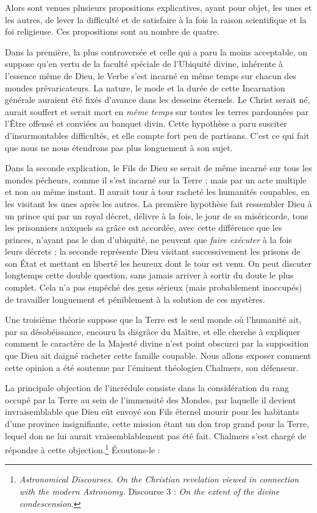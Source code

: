 \documentclass[a4paper, 11pt, oneside, landscape]{article}
\begin{document}
Alors sont venues plusieurs propositions explicatives, ayant pour objet, les unes et les autres, de lever la difficulté et de satisfaire à la fois la raison scientifique et la foi religieuse. Ces propositions sont au nombre de quatre.

Dans la première, la plus controversée et celle qui a paru la moins acceptable, on suppose qu'en vertu de la faculté spéciale de l'Ubiquité divine, inhérente à l'essence même de Dieu, le Verbe s'est incarné en même temps sur chacun des mondes prévaricateurs. La nature, le mode et la durée de cette Incarnation générale auraient été fixés d'avance dans les desseins éternels. Le Christ serait né, aurait souffert et serait mort en \emph{même temps} sur toutes les terres pardonnées par l'Être offensé et conviées au banquet divin. Cette hypothèse a paru susciter d'insurmontables difficultés, et elle compte fort peu de partisans. C'est ce qui fait que nous ne nous étendrons pas plus longuement à son sujet.

Dans la seconde explication, le Fils de Dieu se serait de même incarné sur tous les mondes pécheurs, comme il s'est incarné sur la Terre ; mais par un acte multiple et non au même instant. Il aurait tour à tour racheté les humanités coupables, en les visitant les unes après les autres. La première hypothèse fait ressembler Dieu à un prince qui par un royal décret, délivre à la fois, le jour de sa miséricorde, tous les prisonniers auxquels sa grâce est accordée, avec cette différence que les princes, n'ayant pas le don d'ubiquité, ne peuvent que \emph{faire exécuter} à la fois leurs décrets ; la seconde représente Dieu visitant successivement les prisons de son État et mettant en liberté les heureux dont le tour est venu. On peut discuter longtemps cette double question, sans jamais arriver à sortir du doute le plus complet. Cela n'a pas empêché des gens sérieux (mais probablement inoccupés) de travailler longuement et péniblement à la solution de ces mystères.

Une troisième théorie suppose que la Terre est le seul monde où l'humanité ait, par sa désobéissance, encouru la disgrâce du Maître, et elle cherche à expliquer comment le caractère de la Majesté divine n'est point obscurci par la supposition que Dieu ait daigné racheter cette famille coupable. Nous allons exposer comment cette opinion a été soutenue par l'éminent théologien Chalmers, son défenseur.

La principale objection de l'incrédule consiste dans la considération du rang occupé par la Terre au sein de l'immensité des Mondes, par laquelle il devient invraisemblable que Dieu eût envoyé son Fils éternel mourir pour les habitants d'une province insignifiante, cette mission étant un don trop grand pour la Terre, lequel don ne lui aurait vraisemblablement pas été fait. Chalmers s'est chargé de répondre à cette objection.\footnote{\emph{Astronomical Discourses. On the Christian revelation viewed in connection with the modern Astronomy.} Discourse 3 : \emph{On the extent of the divine condescension}.} Écoutons-le :
\end{document}
